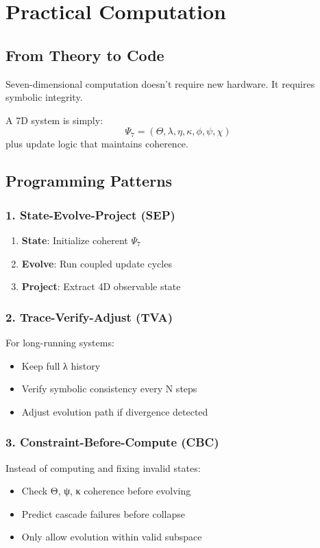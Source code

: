 
\chapter{Practical Computation}

\section{From Theory to Code}

Seven-dimensional computation doesn’t require new hardware. It requires symbolic integrity.

A 7D system is simply:
\[
\Psi_7 = (\Theta, \lambda, \eta, \kappa, \phi, \psi, \chi)
\]
plus update logic that maintains coherence.

\section{Programming Patterns}

\subsection*{1. State-Evolve-Project (SEP)}

\begin{enumerate}
\item \textbf{State}: Initialize coherent $\Psi_7$
\item \textbf{Evolve}: Run coupled update cycles
\item \textbf{Project}: Extract 4D observable state
\end{enumerate}

\subsection*{2. Trace-Verify-Adjust (TVA)}

For long-running systems:
\begin{itemize}
\item Keep full λ history
\item Verify symbolic consistency every N steps
\item Adjust evolution path if divergence detected
\end{itemize}

\subsection*{3. Constraint-Before-Compute (CBC)}

Instead of computing and fixing invalid states:
\begin{itemize}
\item Check Θ, ψ, κ coherence before evolving
\item Predict cascade failures before collapse
\item Only allow evolution within valid subspace
\end{itemize}

